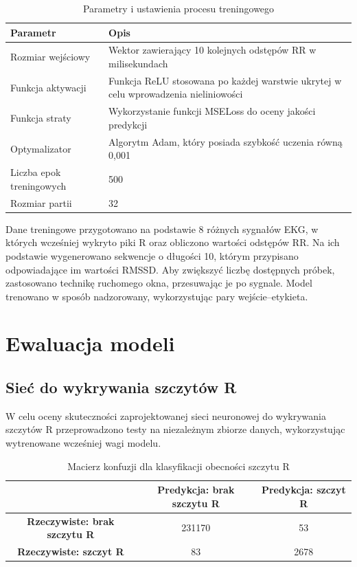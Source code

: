 \documentclass{article}
\begin{document}
\newpage
\newpage
\begin{table}[h!]
\renewcommand{\arraystretch}{1.3}
\centering
\begin{tabular}{|l|p{10cm}|}
\hline
\textbf{Parametr} & \textbf{Opis} \\
\hline
Rozmiar wejściowy & Wektor zawierający 10 kolejnych odstępów RR w milisekundach \\
\hline
Funkcja aktywacji & Funkcja ReLU stosowana po każdej warstwie ukrytej w celu wprowadzenia nieliniowości \\
\hline
Funkcja straty & Wykorzystanie funkcji MSELoss do oceny jakości predykcji \\
\hline
Optymalizator & Algorytm Adam, który posiada szybkość uczenia równą 0{,}001 \\
\hline
Liczba epok treningowych & 500 \\
\hline
Rozmiar partii & 32 \\
\hline
\end{tabular}
\caption{Parametry i ustawienia procesu treningowego}
\end{table}

Dane treningowe przygotowano na podstawie 8 różnych sygnałów EKG, w których wcześniej wykryto piki R oraz obliczono wartości odstępów RR. Na ich podstawie wygenerowano sekwencje o długości 10, którym przypisano odpowiadające im wartości RMSSD. Aby zwiększyć liczbę dostępnych próbek, zastosowano technikę ruchomego okna, przesuwając je po sygnale. Model trenowano w sposób nadzorowany, wykorzystując pary wejście–etykieta.

\newpage
\section{Ewaluacja modeli}
\subsection{Sieć do wykrywania szczytów R}
W celu oceny skuteczności zaprojektowanej sieci neuronowej do wykrywania szczytów R przeprowadzono testy na niezależnym zbiorze danych, wykorzystując wytrenowane wcześniej wagi modelu. 

\begin{table}[h]
\centering
\begin{tabular}{|c|c|c|}
\hline
 & \textbf{Predykcja: brak szczytu R} & \textbf{Predykcja: szczyt R} \\
\hline
\textbf{Rzeczywiste: brak szczytu R} & 231170 & 53 \\
\hline
\textbf{Rzeczywiste: szczyt R} & 83 & 2678 \\
\hline
\end{tabular}
\caption{Macierz konfuzji dla klasyfikacji obecności szczytu R}
\end{table}
\end{document}
